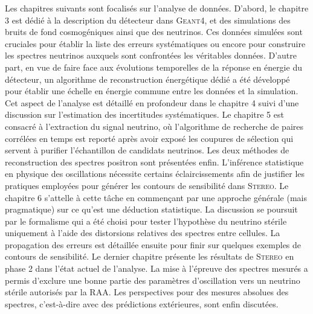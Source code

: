 Les chapitres suivants sont focalisés  sur l'analyse de données. D'abord, le chapitre 3 est dédié à la description du détecteur dans \textsc{Geant4}, et des simulations des bruits de fond cosmogéniques ainsi que des neutrinos. Ces données simulées sont cruciales pour établir la liste des erreurs systématiques ou encore pour construire les spectres neutrinos auxquels sont confrontées les véritables données. D'autre part, en vue de faire face aux évolutions temporelles de la réponse en énergie du détecteur, un algorithme de reconstruction énergétique dédié a été développé pour établir une échelle en énergie commune entre les données et la simulation. Cet aspect de l'analyse est détaillé en profondeur dans le chapitre 4 suivi d'une discussion sur l'estimation des incertitudes systématiques. Le chapitre 5 est consacré à l'extraction du signal neutrino, où l'algorithme de recherche de paires corrélées en temps est reporté après avoir exposé les coupures de sélection qui servent à purifier l'échantillon de candidats neutrinos. Les deux méthodes de reconstruction des spectres positron sont présentées enfin. L'inférence statistique en physique des oscillations nécessite certains éclaircissements afin de justifier les pratiques employées pour générer les contours de sensibilité dans \textsc{Stereo}. Le chapitre 6 s'attelle à cette tâche en commençant par une approche générale (mais pragmatique) sur ce qu'est une déduction statistique. La discussion se poursuit par le formalisme qui a été choisi pour tester l'hypothèse du neutrino stérile uniquement à l'aide des distorsions relatives des spectres entre cellules. La propagation des erreurs est détaillée ensuite pour finir sur quelques exemples de contours de sensibilité. Le dernier chapitre présente les résultats de \textsc{Stereo} en phase 2 dans l'état actuel de l'analyse. La mise à l'épreuve des spectres mesurés a permis d'exclure une bonne partie des paramètres d'oscillation vers un neutrino stérile autorisés par la RAA. Les perspectives pour des mesures absolues des spectres, c'est-à-dire avec des prédictions extérieures, sont enfin discutées.\\


\bigbreak

